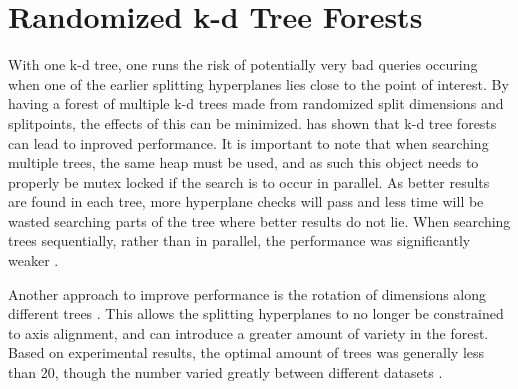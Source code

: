 \section{Randomized k-d Tree Forests}
\label{sec:randomforest}

With one k-d tree, one runs the risk of potentially very bad queries occuring when one of the earlier splitting hyperplanes lies close to the point of interest.  By having a forest of multiple k-d trees made from randomized split dimensions and splitpoints, the effects of this can be minimized.  \citep{silpa2008optimised} has shown that k-d tree forests can lead to inproved performance.  It is important to note that when searching multiple trees, the same heap must be used, and as such this object needs to properly be mutex locked if the search is to occur in parallel.  As better results are found in each tree, more hyperplane checks will pass and less time will be wasted searching parts of the tree where better results do not lie.  When searching trees sequentially, rather than in parallel, the performance was significantly weaker \citep{silpa2008optimised}.

Another approach to improve performance is the rotation of dimensions along different trees \citep{silpa2008optimised}.  This allows the splitting hyperplanes to no longer be constrained to axis alignment, and can introduce a greater amount of variety in the forest.  Based on experimental results, the optimal amount of trees was generally less than 20, though the number varied greatly between different datasets \citep{muja_flann_2009}.